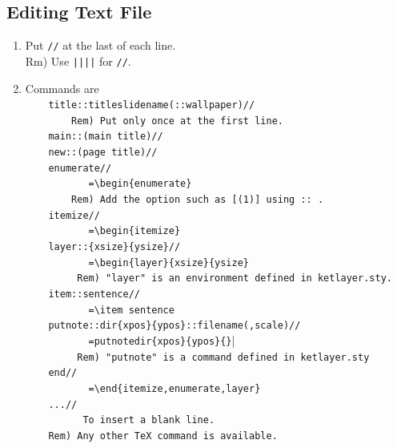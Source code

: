 \documentclass[papersize,a4paper,12pt]{article}
\begin{document}
\subsection{Editing Text File}

\begin{enumerate}[1)]
\item Put \verb|//| at the last of each line.\\
\hspace*{10mm}Rm) Use \verb+||||+ for \verb|//|.
\item Commands are\\
\verb|    title::titleslidename(::wallpaper)//|\\
\verb|        Rem) Put only once at the first line.|\\
\verb|    main::(main title)//|\\
\verb|    new::(page title)//|\\
\verb|    enumerate//|\\
\verb|           =\begin{enumerate}|\\
\verb|        Rem) Add the option such as [(1)] using :: .|\\
\verb|    itemize//|\\
\verb|           =\begin{itemize}|\\
\verb|    layer::{xsize}{ysize}//|\\
\verb|           =\begin{layer}{xsize}{ysize}|\\
\verb|         Rem) "layer" is an environment defined in ketlayer.sty.|\\
\verb|    item::sentence//|\\
\verb|           =\item sentence|\\
\verb|    putnote::dir{xpos}{ypos}::filename(,scale)//|\\
\verb|           =putnotedir{xpos}{ypos}{}||\\
\verb|         Rem) "putnote" is a command defined in ketlayer.sty|\\
\verb|    end//|\\
\verb|           =\end{itemize,enumerate,layer}|\\
\verb|    ...//|\\
\verb|          To insert a blank line.|\\
\verb|    Rem) Any other TeX command is available.|\\
\end{enumerate}
\end{document}
